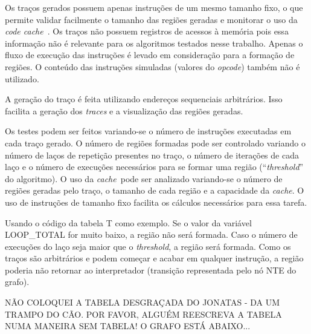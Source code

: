 \documentclass[11pt,twoside]{article}
\newcommand{\ccache}{\emph{code cache}}
\newcommand{\cache}{\emph{cache}}
\newcommand{\qq}[1]{``#1''}
\begin{document}
Os traços gerados possuem apenas instruções de um mesmo tamanho fixo, o que permite validar facilmente o tamanho das regiões geradas e monitorar o uso da \ccache~. Os traços não possuem registros de acessos à memória pois essa informação não é relevante para os algoritmos testados nesse trabalho. Apenas o fluxo de execução das instruções é levado em consideração para a formação de regiões. O conteúdo das instruções simuladas (valores do \emph{opcode}) também não é utilizado. 

A geração do traço é feita utilizando endereços sequenciais arbitrários. Isso facilita a geração dos \emph{traces} e a visualização das regiões geradas.

Os testes podem ser feitos variando-se o número de instruções executadas em cada traço gerado. O número de regiões formadas pode ser controlado variando o número de laços de repetição presentes no traço, o número de iterações de cada laço e o número de execuções necessários para se formar uma região (\qq{\emph{threshold}} do algoritmo). O uso da \cache~pode ser analizado variando-se o número de regiões geradas pelo traço, o tamanho de cada região e a capacidade da \cache. O uso de instruções de tamanho fixo facilita os cálculos necessários para essa tarefa.

Usando o código da tabela T como exemplo. Se o valor da variável LOOP\_TOTAL for muito baixo, a região não será formada. Caso o número de execuções do laço seja maior que o \emph{threshold}, a região será formada. Como os traços são arbitrários e podem começar e acabar em qualquer instrução, a região poderia não retornar ao interpretador (transição representada pelo nó NTE do grafo). 

\begin{large}
NÃO COLOQUEI A TABELA DESGRAÇADA DO JONATAS - DA UM TRAMPO DO CÃO. POR FAVOR, ALGUÉM REESCREVA A TABELA NUMA MANEIRA SEM TABELA! O GRAFO ESTÁ ABAIXO...
\end{large}
\end{document}

